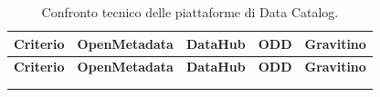 \renewcommand{\arraystretch}{1.4}
\begin{longtable}{ 
    p{} 
    >{\centering\arraybackslash}p{} 
    >{\centering\arraybackslash}p{} 
    >{\centering\arraybackslash}p{} 
    >{\centering\arraybackslash}p{} 
}
\toprule
\textbf{Criterio} & \textbf{OpenMetadata} & \textbf{DataHub} & \textbf{ODD} & \textbf{Gravitino} \\
\midrule
\endfirsthead

\toprule
\textbf{Criterio} & \textbf{OpenMetadata} & \textbf{DataHub} & \textbf{ODD} & \textbf{Gravitino} \\
\midrule
\endhead

\midrule
\noalign{\vspace{10pt}}
\caption[]{Confronto tecnico delle piattaforme di Data Catalog.} \\
\endfoot


\end{longtable}
